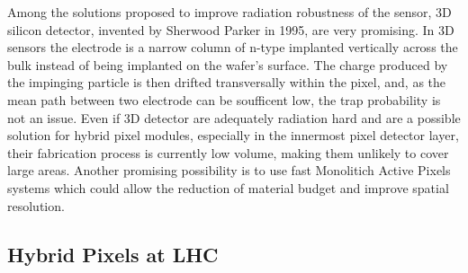     Among the solutions proposed to improve radiation robustness of the sensor, 3D silicon detector, invented by Sherwood Parker in 1995, are very promising.
    In 3D sensors the electrode is a narrow column of n-type implanted vertically across the bulk instead of being implanted on the wafer's surface. 
    The charge produced by the impinging particle is then drifted transversally within the pixel, and, as the mean path between two electrode can be soufficent low, the trap probability is not an issue. 
    Even if 3D detector are adequately radiation hard and are a possible solution for hybrid pixel modules, especially in the innermost pixel detector layer, their fabrication process is currently low volume, making them unlikely to cover large areas.
    Another promising possibility is to use fast Monolitich Active Pixels systems which could allow the reduction of material budget and improve spatial resolution.


    \subsection{Hybrid Pixels at LHC}
